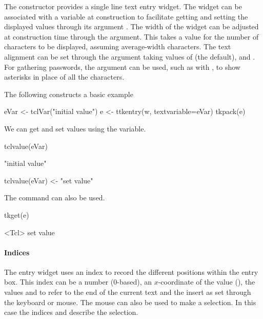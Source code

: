 The  constructor provides a single line text
entry widget. The widget can be associated with a \TCL\/ variable at
construction to facilitate getting and setting the displayed values
through its argument . The width of
the widget can be adjusted at construction time through the
 argument. This takes a value for the number
of characters to be displayed, assuming average-width characters.  The
text alignment can be set through the 
argument taking values of  (the default), 
and . For gathering passwords, the argument
 can be used, such as with
\qcode{*}, to show asterisks in place of all the
characters.

The following constructs a basic example
\begin{Schunk}
\begin{Sinput}
 eVar <- tclVar("initial value")
 e <- ttkentry(w, textvariable=eVar)
 tkpack(e)
\end{Sinput}
\end{Schunk}

We can get and set values using the \TCL\/ variable.
\begin{Schunk}
\begin{Sinput}
 tclvalue(eVar)
\end{Sinput}
\begin{Soutput}
[1] "initial value"
\end{Soutput}
\begin{Sinput}
 tclvalue(eVar) <- "set value"
\end{Sinput}
\end{Schunk}

The  command can also be used.
\begin{Schunk}
\begin{Sinput}
 tkget(e)
\end{Sinput}
\begin{Soutput}
<Tcl> set value 
\end{Soutput}
\end{Schunk}

\paragraph{Indices}
The entry widget uses an index to record the different positions
within the entry box. This index can be a number (0-based), an
$x$-coordinate of the value (), the values  and
 to refer to the end of the current text and the insert
as set through the keyboard or mouse. The mouse can also be used to
make a selection. In this case the indices  and
 describe the selection.

